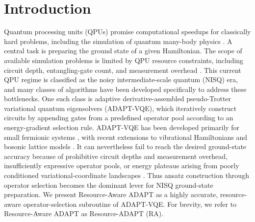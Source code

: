 \documentclass[
  reprint,
  amsmath,
  amssymb,
  aps,
  pra,
  nofootinbib,
  superscriptaddress,
  floatfix
]{revtex4-2}
\begin{document}
\maketitle







\section{Introduction}

Quantum processing units (QPUs) promise computational speedups for classically hard problems, including the simulation of quantum many-body physics \cite{Lloyd1996,AspuruGuzik2005}. A central task is preparing the ground state of a given Hamiltonian. The scope of available simulation problems is limited by QPU resource constraints, including circuit depth, entangling-gate count, and measurement overhead \cite{Preskill2018NISQ,Cerezo2021VQA,Huggins2021Measurements}. This current QPU regime is classified as the noisy intermediate-scale quantum (NISQ) era, and many classes of algorithms have been developed specifically to address these bottlenecks. One such class is adaptive derivative-assembled pseudo-Trotter variational quantum eigensolvers (ADAPT-VQE), which iteratively construct circuits by appending gates from a predefined operator pool according to an energy-gradient selection rule. ADAPT-VQE has been developed primarily for small fermionic systems \cite{Anastasiou2024,Bespalova2026KADAPT,He2026HAADAPT,He2026ParamADAPT}, with recent extensions to vibrational Hamiltonians and bosonic lattice models \cite{Majland2024vADAPT,Athanasakos2026CVADAPT}. It can nevertheless fail to reach the desired ground-state accuracy because of prohibitive circuit depths and measurement overhead, insufficiently expressive operator pools, or energy plateaus arising from poorly conditioned variational-coordinate landscapes \cite{Grimsley2019,Tang2021,Yordanov2021,Feniou2023,Ramoa2025HessianRecycling,Ikhtiarudin2025ShotEfficient,Stadelmann2025GradientTroughs}. Thus ansatz construction through operator selection becomes the dominant lever for NISQ ground-state preparation. We present Resource-Aware ADAPT as a highly accurate, resource-aware operator-selection subroutine of ADAPT-VQE. For brevity, we refer to Resource-Aware ADAPT as Resource-ADAPT (RA).
\end{document}
